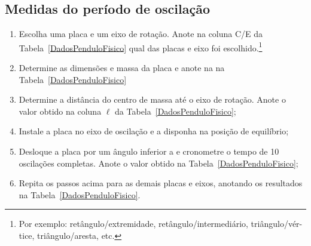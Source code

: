 \subsection{Medidas do período de oscilação} %
\begin{enumerate}
    \item Escolha uma placa e um eixo de rotação. Anote na coluna C/E da Tabela~\ref{DadosPenduloFisico} qual das placas e eixo foi escolhido.\footnote{Por exemplo: retângulo/extremidade, retângulo/intermediário, triângulo/vér-\\tice, triângulo/aresta, etc.}
    \item Determine as dimensões e massa da placa e anote na na Tabela~\ref{DadosPenduloFisico}
	\item Determine a distância do centro de massa até o eixo de rotação. Anote o valor obtido na coluna $\ell$ da Tabela~\ref{DadosPenduloFisico};
	\item Instale a placa no eixo de oscilação e a disponha na posição de equilíbrio;
	\item Desloque a placa por um ângulo inferior a  e cronometre o tempo de 10 oscilações completas. Anote o valor obtido na Tabela~\ref{DadosPenduloFisico};
	\item Repita os passos acima para as demais placas e eixos, anotando os resultados na Tabela~\ref{DadosPenduloFisico}.
\end{enumerate}

\cleardoublepage


\vspace{15mm}

\begin{fullwidth}
\noindent{}
\vspace{5mm}

\noindent{}

\noindent{}

\noindent{}

\noindent{}

\noindent{}
\end{fullwidth}

